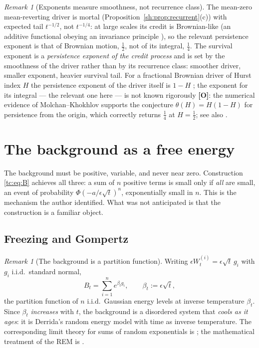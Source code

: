 \documentclass[11pt]{article}
\numberwithin{equation}{section}
\theoremstyle{plain}
\theoremstyle{definition}
\theoremstyle{remark}
\newtheorem{remark}[theorem]{Remark}
\begin{document}
\begin{remark}[Exponents measure smoothness, not recurrence class]
\label{sh:rem:smoothness}
The mean-zero mean-reverting driver is mortal
(Proposition~\ref{sh:prop:recurrent}(c)) with expected tail $t^{-1/2}$, not
$t^{-1/4}$: at large scales its credit is Brownian-like (an additive
functional obeying an invariance principle \cite{Bha82}), so the relevant
persistence exponent is that of Brownian motion, $\tfrac12$, not of its
integral, $\tfrac14$. The survival exponent is a \emph{persistence exponent
of the credit process} and is set by the smoothness of the driver rather
than by its recurrence class: smoother driver, smaller exponent, heavier
survival tail. For a fractional Brownian driver of Hurst index $H$ the
persistence exponent of the driver itself is $1-H$ \cite{Mol99}; the
exponent for its integral --- the relevant one here --- is not known
rigorously \textbf{[O]}: the numerical evidence of Molchan--Khokhlov
\cite{MK04} supports the conjecture $\theta(H)=H(1-H)$ for persistence
from the origin, which correctly returns $\tfrac14$ at $H=\tfrac12$;
see also \cite{AS15}.
\end{remark}

\section{The background as a free energy}\label{app:background}

\label{tc:sub:background}

The background must be positive, variable, and never near zero.
Construction \eqref{tc:eq:B} achieves all three: a sum of $n$ positive
terms is small only if \emph{all} are small, an event of probability
$\Phi(-a/\epsilon\sqrt t)^{n}$, exponentially small in $n$. This is the
mechanism the author identified. What was not anticipated is that the
construction is a familiar object.

\subsection{Freezing and Gompertz}\label{tc:subsub:freezing}

\begin{remark}[The background is a partition function]
\label{tc:rem:partition}
Writing $\epsilon W^{(i)}_t=\epsilon\sqrt t\,g_i$ with $g_i$ i.i.d.\
standard normal,
\[
B_t=\sum_{i=1}^{n}e^{\beta_t g_i},\qquad \beta_t:=\epsilon\sqrt t,
\]
the partition function of $n$ i.i.d.\ Gaussian energy levels at inverse
temperature $\beta_t$. Since $\beta_t$ \emph{increases} with $t$, the
background is a disordered system that \emph{cools as it ages}: it is
Derrida's random energy model \cite{Der81,Der80} with time as inverse
temperature. The corresponding limit theory for sums of random
exponentials is \cite{BBM05}; the mathematical treatment of the REM is
\cite{Bov06}.
\end{remark}
\end{document}
